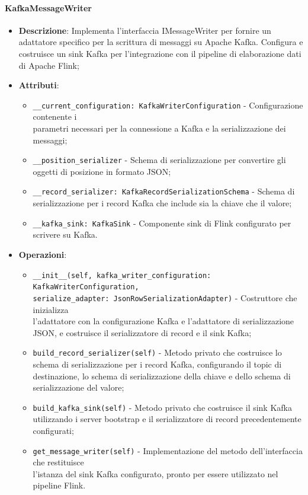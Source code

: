\documentclass[10pt]{article}
\begin{document}
    \paragraph{KafkaMessageWriter}
    \begin{itemize} 
    \item \textbf{Descrizione}: Implementa l'interfaccia IMessageWriter per fornire un adattatore specifico per la scrittura di messaggi su Apache Kafka. Configura e costruisce un sink Kafka per l'integrazione con il pipeline di elaborazione dati di Apache Flink;
    \item \textbf{Attributi}:
    \begin{itemize}
        \item \texttt{\_\_current\_configuration: KafkaWriterConfiguration} - Configurazione contenente i\\ parametri necessari per la connessione a Kafka e la serializzazione dei messaggi;
        \item \texttt{\_\_position\_serializer} - Schema di serializzazione per convertire gli oggetti di posizione in formato JSON;
        \item \texttt{\_\_record\_serializer: KafkaRecordSerializationSchema} - Schema di serializzazione per i record Kafka che include sia la chiave che il valore;
        \item \texttt{\_\_kafka\_sink: KafkaSink} - Componente sink di Flink configurato per scrivere su Kafka.
    \end{itemize}
    
    \item \textbf{Operazioni}:
    \begin{itemize}
        \item \texttt{\_\_init\_\_(self, kafka\_writer\_configuration: KafkaWriterConfiguration,\\ serialize\_adapter: JsonRowSerializationAdapter)} - Costruttore che inizializza\\ l'adattatore con la configurazione Kafka e l'adattatore di serializzazione JSON, e costruisce il serializzatore di record e il sink Kafka;
        
        \item \texttt{build\_record\_serializer(self)} - Metodo privato che costruisce lo schema di serializzazione per i record Kafka, configurando il topic di destinazione, lo schema di serializzazione della chiave e dello schema di serializzazione del valore;
        
        \item \texttt{build\_kafka\_sink(self)} - Metodo privato che costruisce il sink Kafka utilizzando i server bootstrap e il serializzatore di record precedentemente configurati;
        
        \item \texttt{get\_message\_writer(self)} - Implementazione del metodo dell'interfaccia che restituisce\\ l'istanza del sink Kafka configurato, pronto per essere utilizzato nel pipeline Flink.
    \end{itemize}
    \end{itemize}
\end{document}

